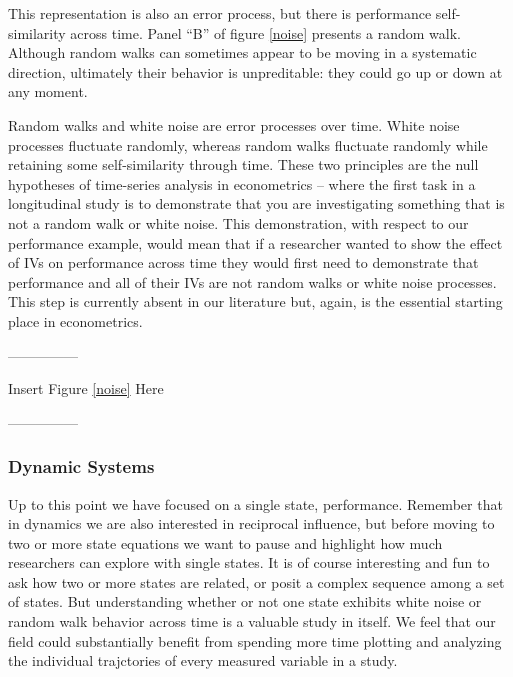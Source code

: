 \documentclass[english,,man]{apa6}
\theoremstyle{definition}
\theoremstyle{definition}
\theoremstyle{definition}
\theoremstyle{remark}
\begin{document}
\noindent This representation is also an error process, but there is
performance self-similarity across time. Panel \enquote{B} of figure
\ref{noise} presents a random walk. Although random walks can sometimes
appear to be moving in a systematic direction, ultimately their behavior
is unpreditable: they could go up or down at any moment.

Random walks and white noise are error processes over time. White noise
processes fluctuate randomly, whereas random walks fluctuate randomly
while retaining some self-similarity through time. These two principles
are the null hypotheses of time-series analysis in econometrics -- where
the first task in a longitudinal study is to demonstrate that you are
investigating something that is not a random walk or white noise. This
demonstration, with respect to our performance example, would mean that
if a researcher wanted to show the effect of IVs on performance across
time they would first need to demonstrate that performance and all of
their IVs are not random walks or white noise processes. This step is
currently absent in our literature but, again, is the essential starting
place in econometrics.

\begin{center}

---------------

Insert Figure \ref{noise} Here

---------------

\end{center}

\hypertarget{dynamic-systems}{%
\subsubsection{Dynamic Systems}\label{dynamic-systems}}

Up to this point we have focused on a single state, performance.
Remember that in dynamics we are also interested in reciprocal
influence, but before moving to two or more state equations we want to
pause and highlight how much researchers can explore with single states.
It is of course interesting and fun to ask how two or more states are
related, or posit a complex sequence among a set of states. But
understanding whether or not one state exhibits white noise or random
walk behavior across time is a valuable study in itself. We feel that
our field could substantially benefit from spending more time plotting
and analyzing the individual trajctories of every measured variable in a
study.
\end{document}
